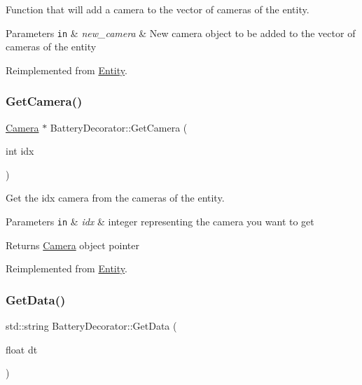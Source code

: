 Function that will add a camera to the vector of cameras of the entity. 


\begin{DoxyParams}[1]{Parameters}
\mbox{\tt in}  & {\em new\+\_\+camera} & New camera object to be added to the vector of cameras of the entity \\
\hline
\end{DoxyParams}


Reimplemented from \hyperlink{classEntity_a9f3c739a3ef623a9febc7801270ba719}{Entity}.

\mbox{\label{classBatteryDecorator_ad65baa2cd098b990a49bdff7c0fde62c}} 
\subsubsection{\texorpdfstring{Get\+Camera()}{GetCamera()}}
{\footnotesize\ttfamily \hyperlink{classCamera}{Camera} $\ast$ Battery\+Decorator\+::\+Get\+Camera (\begin{DoxyParamCaption}\item[{int}]{idx }\end{DoxyParamCaption})\hspace{0.3cm}{\ttfamily [virtual]}}



Get the idx camera from the cameras of the entity. 


\begin{DoxyParams}[1]{Parameters}
\mbox{\tt in}  & {\em idx} & integer representing the camera you want to get\\
\hline
\end{DoxyParams}
\begin{DoxyReturn}{Returns}
\hyperlink{classCamera}{Camera} object pointer 
\end{DoxyReturn}


Reimplemented from \hyperlink{classEntity_ae09d3e79d0d14c2990b1da52d2268399}{Entity}.

\mbox{\label{classBatteryDecorator_a47475a9179285e30e8c18316cebdac9f}} 
\subsubsection{\texorpdfstring{Get\+Data()}{GetData()}}
{\footnotesize\ttfamily std\+::string Battery\+Decorator\+::\+Get\+Data (\begin{DoxyParamCaption}\item[{float}]{dt }\end{DoxyParamCaption})\hspace{0.3cm}{\ttfamily [virtual]}}



